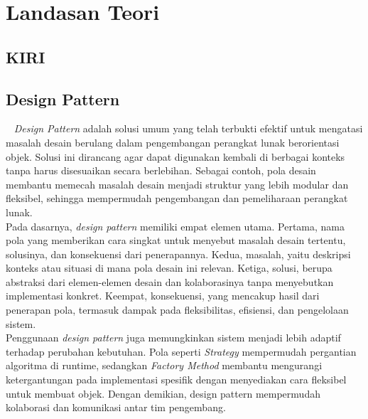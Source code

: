 \chapter{Landasan Teori}
\label{chap:teori}

\section{KIRI}
\label{sec:kiri}

\section{Design Pattern}
\label{sec:designpattern}
~\cite{Gamma:94:design}
\textit{Design Pattern} adalah solusi umum yang telah terbukti efektif untuk mengatasi masalah desain berulang dalam pengembangan perangkat lunak berorientasi objek. Solusi ini dirancang agar dapat digunakan kembali di berbagai konteks tanpa harus disesuaikan secara berlebihan. Sebagai contoh, pola desain membantu memecah masalah desain menjadi struktur yang lebih modular dan fleksibel, sehingga mempermudah pengembangan dan pemeliharaan perangkat lunak.
\\
Pada dasarnya, \textit{design pattern} memiliki empat elemen utama. Pertama, nama pola yang memberikan cara singkat untuk menyebut masalah desain tertentu, solusinya, dan konsekuensi dari penerapannya. Kedua, masalah, yaitu deskripsi konteks atau situasi di mana pola desain ini relevan. Ketiga, solusi, berupa abstraksi dari elemen-elemen desain dan kolaborasinya tanpa menyebutkan implementasi konkret. Keempat, konsekuensi, yang mencakup hasil dari penerapan pola, termasuk dampak pada fleksibilitas, efisiensi, dan pengelolaan sistem.
\\
Penggunaan \textit{design pattern} juga memungkinkan sistem menjadi lebih adaptif terhadap perubahan kebutuhan. Pola seperti \textit{Strategy} mempermudah pergantian algoritma di runtime, sedangkan \textit{Factory Method} membantu mengurangi ketergantungan pada implementasi spesifik dengan menyediakan cara fleksibel untuk membuat objek. Dengan demikian, design pattern mempermudah kolaborasi dan komunikasi antar tim pengembang.

